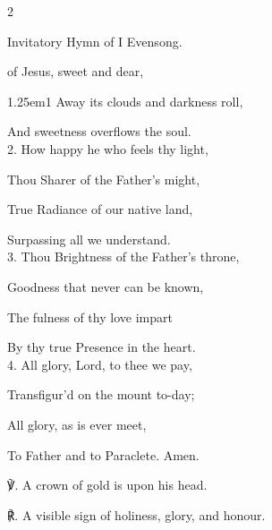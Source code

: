 \begin{paracol}{2}
\switchcolumn

\vspace{-1\baselineskip}

\mattins
{}

\begin{rubric}
	Invitatory Hymn of I Evensong.
\end{rubric}

\mattinsOfficeHymn
{} of Jesus, sweet and dear,


\begin{hangparas}{1.25em}{1}
Away its clouds and darkness roll,

And sweetness overflows the soul.\\

2. How happy he who feels thy light,

Thou Sharer of the Father's might,

True Radiance of our native land,

Surpassing all we understand.\\

3. Thou Brightness of the Father’s throne,

Goodness that never can be known,

The fulness of thy love impart

By thy true Presence in the heart.\\

4. All glory, Lord, to thee we pay,

Transfigur'd on the mount to-day;

All glory, as is ever meet,

To Father and to Paraclete. Amen.\\
\end{hangparas}

℣. A crown of gold is upon his head.

℟. A visible sign of holiness, glory, and honour.


\fussy	
\end{paracol}

\secondEvensong
{}

